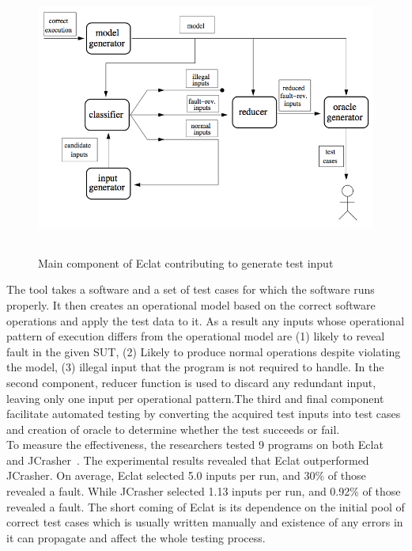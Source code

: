 {\begin{figure}[h]
	\centering
	\includegraphics[width=15cm, height=9cm]{Literature/eclat_working.png}
	\caption{Main component of Eclat contributing to generate test input~\cite{Pacheco2005}}
	\label{fig:eclat}
\end{figure}


\noindent The tool takes a software and a set of test cases for which the software runs properly. It then creates an operational model based on the correct software operations and apply the test data to it. As a result any inputs whose operational pattern of execution differs from the operational model are (1) likely to reveal fault in the given SUT, (2) Likely to produce normal operations despite violating the model, (3) illegal input that the program is not required to handle. In the second component, reducer function is used to discard any redundant input, leaving only one input per operational pattern.The third and final component facilitate automated testing by converting the acquired test inputs into test cases and creation of oracle to determine whether the test succeeds or fail. \\
\indent To measure the effectiveness, the researchers tested 9 programs on both Eclat and JCrasher~\cite{Pacheco2007b}.  The experimental results revealed that Eclat outperformed JCrasher. On average, Eclat selected 5.0 inputs per run, and 30\% of those revealed a fault. While JCrasher selected 1.13 inputs per run, and 0.92\% of those revealed a fault. The short coming of Eclat is its dependence on the initial pool of correct test cases which is usually written manually and existence of any errors in it can propagate and affect the whole testing process.    

}
